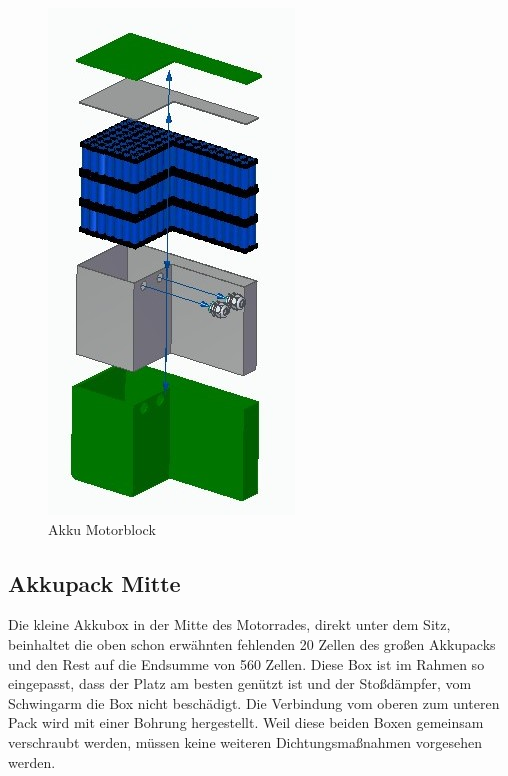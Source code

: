 \begin{figure} [H]
	\begin{center}
		\includegraphics[scale=0.5]{figures/mechanik/Akku_Motorblock_Explosion.jpg}
			\caption{Akku Motorblock}
			\label{fig:Akku Motorblock}
	\end{center}
\end{figure}


\subsection{Akkupack Mitte}
Die kleine Akkubox in der Mitte des Motorrades, direkt unter dem Sitz, beinhaltet die oben schon erwähnten fehlenden 20 Zellen des großen Akkupacks und den Rest auf die Endsumme von 560 Zellen. Diese Box ist im Rahmen so eingepasst, dass der Platz am besten genützt ist und der Stoßdämpfer, vom Schwingarm die Box nicht beschädigt. Die Verbindung vom oberen zum unteren Pack wird mit einer Bohrung hergestellt. Weil diese beiden Boxen gemeinsam verschraubt werden, müssen keine weiteren Dichtungsmaßnahmen vorgesehen werden.


